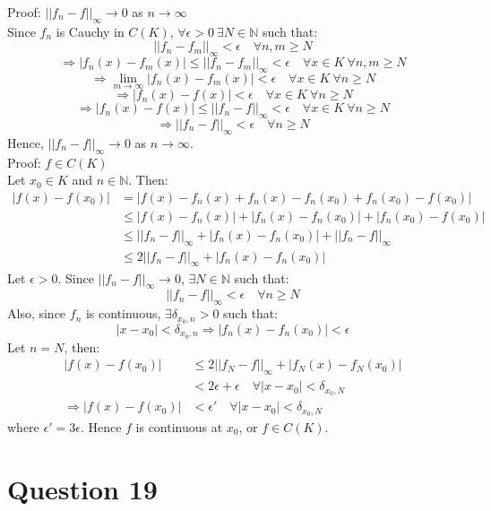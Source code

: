 \documentclass{article}
\begin{document}
	Proof: $||f_n - f||_\infty \to 0$ as $n \to \infty$ \\
	Since $f_n$ is Cauchy in $C(K)$, $\forall \epsilon > 0 ~ \exists N \in \mathbb{N}$ such that:
	\[ ||f_n - f_m||_\infty < \epsilon \quad \forall n, m \ge N \]
	\[
		\Rightarrow |f_n(x) - f_m(x)| \le ||f_n - f_m||_\infty < \epsilon
		\quad \forall x \in K ~ \forall n, m \ge N
	\]
	\[
		\Rightarrow \lim_{m \to \infty} |f_n(x) - f_m(x)| < \epsilon
		\quad \forall x \in K ~ \forall n \ge N
	\]
	\[ \Rightarrow |f_n(x) - f(x)| < \epsilon \quad \forall x \in K ~ \forall n \ge N \]
	\[
		\Rightarrow |f_n(x) - f(x)| \le ||f_n - f||_\infty < \epsilon
		\quad \forall x \in K ~ \forall n \ge N
	\]
	\[ \Rightarrow ||f_n - f||_\infty < \epsilon \quad \forall n \ge N \]
	Hence, $||f_n - f||_\infty \to 0$ as $n \to \infty$. \\

	Proof: $f \in C(K)$ \\
	Let $x_0 \in K$ and $n \in \mathbb{N}$.
	Then:
	\begin{align*}
		|f(x) - f(x_0)| &= |f(x) - f_n(x) + f_n(x) - f_n(x_0) + f_n(x_0) - f(x_0)| \\
		&\le |f(x) - f_n(x)| + |f_n(x) - f_n(x_0)| + |f_n(x_0) - f(x_0)| \\
		&\le ||f_n - f||_\infty + |f_n(x) - f_n(x_0)| + ||f_n - f||_\infty \\
		&\le 2 ||f_n - f||_\infty + |f_n(x) - f_n(x_0)|
	\end{align*}
	Let $\epsilon > 0$.
	Since $||f_n - f||_\infty \to 0$, $\exists N \in \mathbb{N}$ such that:
	\[ ||f_n - f||_\infty < \epsilon \quad \forall n \ge N \]
	Also, since $f_n$ is continuous, $\exists \delta_{x_0, n} > 0$ such that:
	\[ |x - x_0| < \delta_{x_0, n} \Rightarrow |f_n(x) - f_n(x_0)| < \epsilon \]
	Let $n = N$, then:
	\begin{align*}
		|f(x) - f(x_0)| &\le 2 ||f_N - f||_\infty + |f_N(x) - f_N(x_0)| \\
		&< 2 \epsilon + \epsilon \quad \forall |x - x_0| < \delta_{x_0, N} \\
		\Rightarrow |f(x) - f(x_0)| &< \epsilon' \quad \forall |x - x_0| < \delta_{x_0, N}
	\end{align*}
	where $\epsilon' = 3 \epsilon$.
	Hence $f$ is continuous at $x_0$, or $f \in C(K)$.

\section{Question 19}
\end{document}
